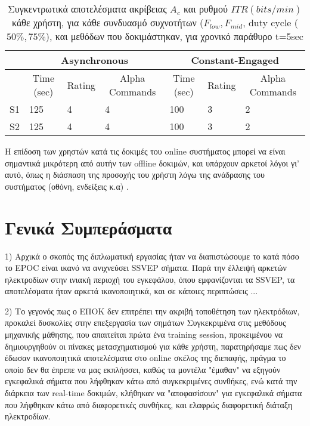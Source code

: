\documentclass[11pt,a4paper,english,greek,twoside]{../Thesis}
\begin{document}
\begin{table}[H]
    \centering
    \begin{tabular}{ |p{1cm}||p{1cm}|p{1cm}|p{1cm}|p{1cm}|p{1cm}|p{1cm}|}
        \hline
        & \multicolumn{3}{c|}{Asynchronous} & \multicolumn{3}{c|}{Constant-Engaged} \\
        \hline
        & \multicolumn{1}{c|}{Time (sec)} & \multicolumn{1}{c|}{Rating} &
        \multicolumn{1}{c|}{Alpha Commands} & \multicolumn{1}{c|}{Time (sec)} & \multicolumn{1}{c|}{Rating} &
        \multicolumn{1}{c|}{Alpha Commands} \\
        \hline
        S1          & 125& 4& 4& 100& 3& 2 \\
        S2          & 125& 4& 4& 100& 3& 2 \\
        \hline
    \end{tabular}
    \caption{Συγκεντρωτικά αποτελέσματα ακρίβειας $A_c$ και ρυθμού $ITR (bits/min)$ κάθε χρήστη, για κάθε συνδυασμό συχνοτήτων ($F_{low}, F_{mid}$, duty cycle ($50\%, 75\%$), και μεθόδων που δοκιμάστηκαν, για χρονικό παράθυρο t=5sec}
    \label{tab:online}
\end{table}

\par Η επίδοση των χρηστών κατά τις δοκιμές του online συστήματος μπορεί να είναι σημαντικά μικρότερη από αυτήν των offline δοκιμών, και υπάρχουν αρκετοί λόγοι γι' αυτό, όπως η διάσπαση της προσοχής του χρήστη λόγω της ανάδρασης του συστήματος (οθόνη, ενδείξεις κ.α)\cite{Muller-Putz2006-wj} \cite{Yuan2013-jp}.

\section{Γενικά Συμπεράσματα}
1) Αρχικά ο σκοπός της διπλωματική εργασίας ήταν να διαπιστώσουμε το κατά πόσο το EPOC είναι ικανό να ανιχνεύσει SSVEP σήματα. Παρά την έλλειψή αρκετών ηλεκτροδίων στην ινιακή περιοχή του εγκεφάλου, όπου εμφανίζονται τα SSVEP, τα αποτελέσματα ήταν αρκετά ικανοποιητικά, και σε κάποιες περιπτώσεις ...

2) Το γεγονός πως ο ΕΠΟΚ δεν επιτρέπει την ακριβή τοποθέτηση των ηλεκτρόδιων, προκαλεί δυσκολίες στην επεξεργασία των σημάτων Συγκεκριμένα στις μεθόδους μηχανικής μάθησης, που απαιτείται πρώτα ένα training session, προκειμένου να δημιουργηθούν οι πίνακες μετασχηματισμού για κάθε χρήστη, παρατηρήσαμε πως δεν έδωσαν ικανοποιητικά αποτελέσματα στο online σκέλος της διεπαφής, πράγμα το οποίο δεν θα έπρεπε να μας εκπλήσσει, καθώς τα μοντέλα "έμαθαν" να εξηγούν εγκεφαλικά σήματα που λήφθηκαν κάτω από συγκεκριμένες συνθήκες, ενώ κατά την διάρκεια των real-time δοκιμών, κλήθηκαν να "αποφασίσουν" για εγκεφαλικά σήματα που λήφθηκαν κάτω από διαφορετικές συνθήκες, και ελαφρώς διαφορετική διάταξη ηλεκτροδίων. 
\end{document}
